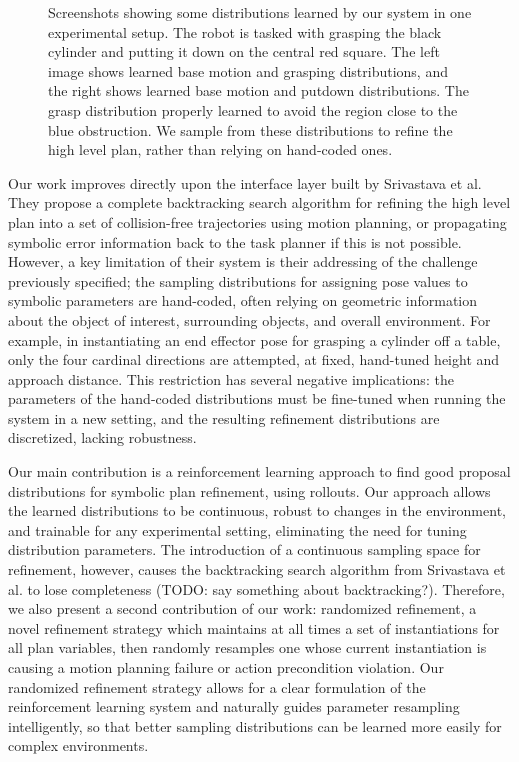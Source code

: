 \begin{figure}[h]
  \caption{Screenshots showing some distributions learned by our system in one experimental
    setup. The robot is tasked with grasping the black cylinder and putting it down on the
    central red square. The left image shows learned base motion and grasping distributions,
    and the right shows learned base motion and putdown distributions. The grasp distribution
    properly learned to avoid the region close to the blue obstruction. We sample from these distributions
    to refine the high level plan, rather than relying on hand-coded ones.}
  \label{fig:cover}
\end{figure}

Our work improves directly upon the interface layer built
by Srivastava et al. They propose a complete backtracking search algorithm for refining
the high level plan into a set of collision-free trajectories using motion planning, or
propagating symbolic error information back to the task planner if this is not possible.
However, a key limitation of their system is their addressing of the challenge
previously specified; the sampling distributions for
assigning pose values to symbolic parameters are hand-coded, often relying on
geometric information about the object of interest, surrounding objects, and overall
environment. For example, in instantiating an end effector pose for grasping a cylinder off a table,
only the four cardinal directions are attempted, at fixed, hand-tuned height and approach
distance. This restriction has several negative implications: the parameters of the
hand-coded distributions must be fine-tuned when running the system in a new setting, and the
resulting refinement distributions are discretized, lacking robustness.

Our main contribution is a reinforcement learning approach to find good proposal
distributions for symbolic plan refinement, using rollouts. Our approach allows
the learned distributions to be continuous, robust to changes in the environment, and
trainable for any experimental setting, eliminating the need for tuning distribution parameters. The
introduction of a continuous sampling space for refinement, however, causes the backtracking
search algorithm from Srivastava et al. to lose completeness (TODO: say something about backtracking?). Therefore, we also
present a second contribution of our work: randomized refinement, a novel refinement strategy
which maintains at all times a set of instantiations for all plan variables, then randomly
resamples one whose current instantiation is causing a motion planning failure or action precondition
violation. Our randomized refinement strategy allows for a clear formulation of the reinforcement
learning system and naturally guides parameter resampling intelligently, so that better
sampling distributions can be learned more easily for complex environments.

